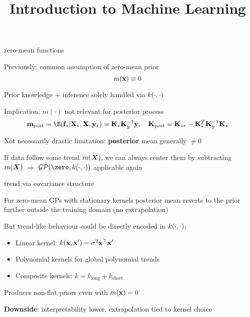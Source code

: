 \documentclass[11pt,compress,t,notes=noshow, xcolor=table]{beamer}
\title{Introduction to Machine Learning}
\begin{document}


\begin{framei}[sep=L]{zero-mean functions}
\item Previously: common assumption of zero-mean prior $$m(\mathbf{x}) \equiv 0$$
\item Prior knowledge + inference solely handled via $k(\cdot, \cdot)$
\item Implication: $m(\cdot)$ not relevant for posterior process
$$\mv_{\text{post}} = \E(\fs | \Xs, \Xmat, \ys) = \Ks \Ky^{-1} \yv, \quad \Kmat_{\text{post}} = \Kss - \Ks^T \Ky^{-1} \Ks$$
\item Not necessarily drastic limitation: \textbf{posterior} mean generally $\neq 0$
\item If data follow some trend $m(\bm{X})$, we can always center them by subtracting $m(\bm{X})$ $\Rightarrow$ $\GPzk$ applicable again
\end{framei}



\begin{framei}[sep=L]{trend via covariance structure}
\item For zero-mean GPs with stationary kernels posterior mean reverts to the prior further outside the training domain (no extrapolation)
\item But trend-like behaviour could be directly encoded in $k(\cdot, \cdot)$:
\begin{itemize}
  \item Linear kernel: $k(\mathbf{x},\mathbf{x}')=\sigma^2 \mathbf{x}^\top \mathbf{x}'$
  \item Polynomial kernels for global polynomial trends
  \item Composite kernels: $k = k_{\text{long}} + k_{\text{short}}$
\end{itemize}
\item Produces non-flat priors even with $m(\mathbf{x})=0$
\item \textbf{Downside}: interpretability lower, extrapolation tied to kernel choice
\end{framei}
\end{document}
